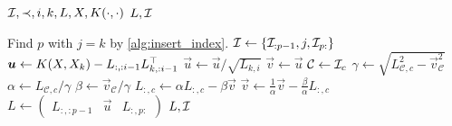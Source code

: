 \begin{algorithmic}[1]
  \REQUIRE \( \mathcal{I}, \prec, i, k, L, X, K(\cdot, \cdot) \)
  \ENSURE \( L, \mathcal{I} \)

  \STATE Find \( p \) with \( j = k \) by \cref{alg:insert_index}.
  \STATE \( \mathcal{I} \gets \{ \mathcal{I}_{:p - 1}, j, \mathcal{I}_{p:} \} \)
  \STATE \( \bm{u} \gets K(X, X_k) - L_{:, :i - 1} L_{k, :i - 1}^{\top} \)
  \STATE \( \vec{u} \gets \vec{u}/\sqrt{L_{k, i}} \)
  \STATE \( \vec{v} \gets \vec{u} \)
    \STATE \( \mathcal{C} \gets \mathcal{I}_c \)
    \STATE \( \gamma \gets
      \sqrt{L_{\mathcal{C}, c}^2 - \vec{v}_{\mathcal{C}}^2}
    \)
    \STATE \( \alpha \gets  L_{\mathcal{C}, c}/\gamma \)
    \STATE \( \beta \gets \vec{v}_{\mathcal{C}}/\gamma \)
    \STATE \( L_{:, c} \gets \alpha L_{:, c} - \beta \vec{v} \)
    \STATE \( \vec{v} \gets
      \frac{1}{\alpha} \vec{v} - \frac{\beta}{\alpha} L_{:, c}
    \)
  \ENDFOR
  \STATE \( L \gets
    \begin{pmatrix}
      L_{:, :p - 1} & \vec{u} & L_{:, p:}
    \end{pmatrix}
  \)
  \RETURN \( L, \mathcal{I} \)
\end{algorithmic}
